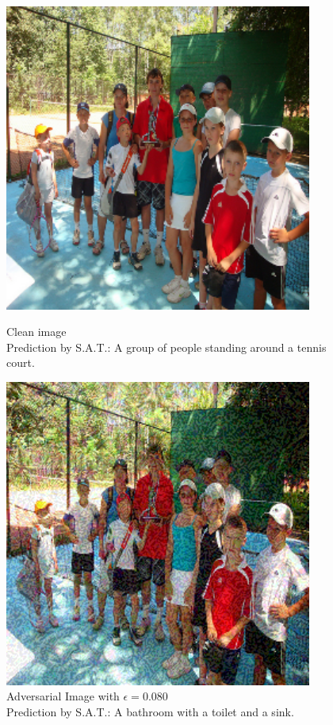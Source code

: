 \begin{figure}[ht]
    \centering
    \begin{minipage}{0.45\textwidth}
        \centering
        \includegraphics[width=0.9\textwidth]{figures/group_of_people/group_of_people_0.000.png} %
        \caption*{Clean image\\Prediction by S.A.T.: A group of people standing around a tennis court.}
    \end{minipage}\hfill
    \begin{minipage}{0.45\textwidth}
        \centering
        \includegraphics[width=0.9\textwidth]{figures/group_of_people/group_of_people_0.080.png} %
        \caption*{Adversarial Image with $\epsilon=0.080$\\Prediction by S.A.T.:  A bathroom with a toilet and a sink.}
    \end{minipage}
\end{figure}

